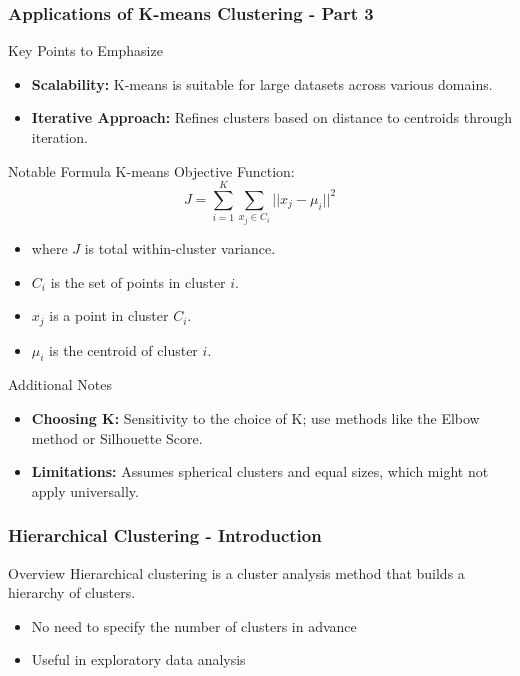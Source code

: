 \documentclass[aspectratio=169]{beamer}
\begin{document}
\begin{frame}[fragile]
    \frametitle{Applications of K-means Clustering - Part 3}
    \begin{block}{Key Points to Emphasize}
        \begin{itemize}
            \item \textbf{Scalability:} K-means is suitable for large datasets across various domains.
            \item \textbf{Iterative Approach:} Refines clusters based on distance to centroids through iteration.
        \end{itemize}
    \end{block}
    
    \begin{block}{Notable Formula}
        K-means Objective Function: 
        \begin{equation}
        J = \sum_{i=1}^{K}\sum_{x_j \in C_i} ||x_j - \mu_i||^2
        \end{equation}
        \begin{itemize}
            \item where \(J\) is total within-cluster variance.
            \item \(C_i\) is the set of points in cluster \(i\).
            \item \(x_j\) is a point in cluster \(C_i\).
            \item \(\mu_i\) is the centroid of cluster \(i\).
        \end{itemize}
    \end{block}
    
    \begin{block}{Additional Notes}
        \begin{itemize}
            \item \textbf{Choosing K:} Sensitivity to the choice of K; use methods like the Elbow method or Silhouette Score.
            \item \textbf{Limitations:} Assumes spherical clusters and equal sizes, which might not apply universally.
        \end{itemize}
    \end{block}
\end{frame}

\begin{frame}
    \frametitle{Hierarchical Clustering - Introduction}
    \begin{block}{Overview}
        Hierarchical clustering is a cluster analysis method that builds a hierarchy of clusters.
        \begin{itemize}
            \item No need to specify the number of clusters in advance
            \item Useful in exploratory data analysis
        \end{itemize}
    \end{block}
\end{frame}
\end{document}
